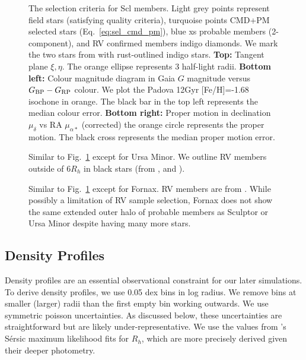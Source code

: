 \begin{figure}
\centering
{}
\caption[Sculptor sample selection]{The selection criteria for Scl
members. Light grey points represent field stars (satisfying quality
criteria), turquoise points CMD+PM selected stars
(Eq.~\ref{eq:sel_cmd_pm}), blue xs probable members (2-component), and
RV confirmed members indigo diamonds. We mark the two stars from
\citet{sestito+2023a} with rust-outlined indigo stars. \textbf{Top:}
Tangent plane \(\xi, \eta\). The orange ellipse represents 3 half-light
radii. \textbf{Bottom left:} Colour magnitude diagram in Gaia \(G\)
magnitude versus \(G_{\rm BP} - G_{\rm RP}\) colour. We plot the Padova
12Gyr {[}Fe/H{]}=-1.68 isochone in orange. The black bar in the top left
represents the median colour error. \textbf{Bottom right:} Proper motion
in declination \(\mu_\delta\) vs RA \(\mu_{\alpha*}\) (corrected) the
orange circle represents the \citet{MV2020b} proper motion. The black
cross represents the median proper motion
error.}\label{fig:scl_selection}
\end{figure}

\begin{figure}
\centering
{}
\caption[Ursa Minor sample selection]{Similar to
Fig.~\ref{fig:scl_selection} except for Ursa Minor. We outline RV
members outside of \(6R_h\) in black stars (from \citet{sestito+2023b},
\citet{pace+2020} and \citet{spencer+2018}).}\label{fig:umi_selection}
\end{figure}

\begin{figure}
\centering
{}
\caption[Fornax sample selection]{Similar to
Fig.~\ref{fig:scl_selection} except for Fornax. RV members are from
\citet{WMO2009}. While possibly a limitation of RV sample selection,
Fornax does not show the same extended outer halo of probable members as
Sculptor or Ursa Minor despite having many more
stars.}\label{fig:fornax_selection}
\end{figure}

\subsection{Density Profiles}\label{density-profiles}

Density profiles are an essential observational constraint for our later
simulations. To derive density profiles, we use 0.05 dex bins in log
radius. We remove bins at smaller (larger) radii than the first empty
bin working outwards. We use symmetric poisson uncertainties. As
discussed below, these uncertainties are straightforward but are likely
under-representative. We use the values from \citet{munoz+2018}'s Sérsic
maximum likelihood fits for \(R_h\), which are more precisely derived
given their deeper photometry.

